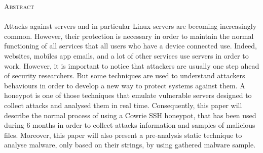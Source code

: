 \textsc{\LARGE Abstract}\\[0.5cm]

\paragraph{}

Attacks against servers and in particular Linux servers are becoming increasingly
common. However, their protection is necessary in order to maintain the normal functioning
of all services that all users who have a device connected use. Indeed, websites, mobiles app
emails, and a lot of other services use servers in order to work.
However, it is important to notice that attackers  are usually one step ahead of security
researchers. But some techniques are used to understand attackers behaviours in order to 
develop a new way to protect systems against them. A honeypot is one of those techniques that
emulate vulnerable servers designed to collect attacks and analysed them in real time.
Consequently, this paper will describe the normal process of using a Cowrie SSH honeypot,
that has been used during 6 months in order to collect attacks information and samples of
malicious files. Moreover, this paper will also present a pre-analysis static technique
to analyse malware, only based on their strings, by using gathered malware sample. 


\newpage